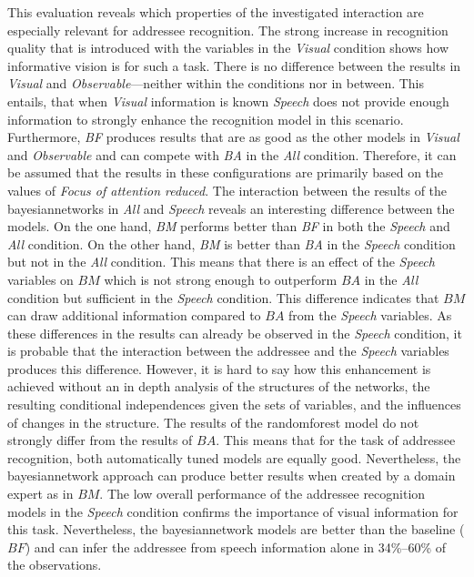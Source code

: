 This evaluation reveals which properties of the investigated interaction are especially relevant for \gls{addressee} recognition.
The strong increase in recognition quality that is introduced with the variables in the \emph{Visual} condition shows how informative vision is for such a task.
There is no difference between the results in \emph{Visual} and \emph{Observable}---neither within the conditions nor in between.
This entails, that when \emph{Visual} information is known \emph{Speech} does not provide enough information to strongly enhance the recognition model in this scenario.
Furthermore, \emph{BF} produces results that are as good as the other models in \emph{Visual} and \emph{Observable} and can compete with \emph{BA} in the \emph{All} condition.
Therefore, it can be assumed that the results in these configurations are primarily based on the values of \emph{Focus of attention reduced}.
The interaction between the results of the \glspl{bayesiannetwork} in \emph{All} and \emph{Speech} reveals an interesting difference between the models.
On the one hand, \emph{BM} performs better than \emph{BF} in both the \emph{Speech} and \emph{All} condition.
On the other hand, \emph{BM} is better than \emph{BA} in the \emph{Speech} condition but not in the \emph{All} condition.
This means that there is an effect of the \emph{Speech} variables on \(BM\) which is not strong enough to outperform \(BA\) in the \emph{All} condition but sufficient in the \emph{Speech} condition. 
This difference indicates that \(BM\) can draw additional information compared to \(BA\) from the \emph{Speech} variables.
As these differences in the results can already be observed in the \emph{Speech} condition, it is probable that the interaction between the \gls{addressee} and the \emph{Speech} variables produces this difference.
However, it is hard to say how this enhancement is achieved without an in depth analysis of the structures of the networks, the resulting conditional independences given the sets of variables, and the influences of changes in the structure.
The results of the \gls{randomforest} model do not strongly differ from the results of \(BA\).
This means that for the task of \gls{addressee} recognition, both automatically tuned models are equally good.
Nevertheless, the \gls{bayesiannetwork} approach can produce better results when created by a domain expert as in \(BM\).
The low overall performance of the \gls{addressee} recognition models in the \emph{Speech} condition confirms the importance of visual information for this task.
Nevertheless, the \gls{bayesiannetwork} models are better than the baseline (\(BF\)) and can infer the \gls{addressee} from speech information alone in 34\%--60\% of the observations.

